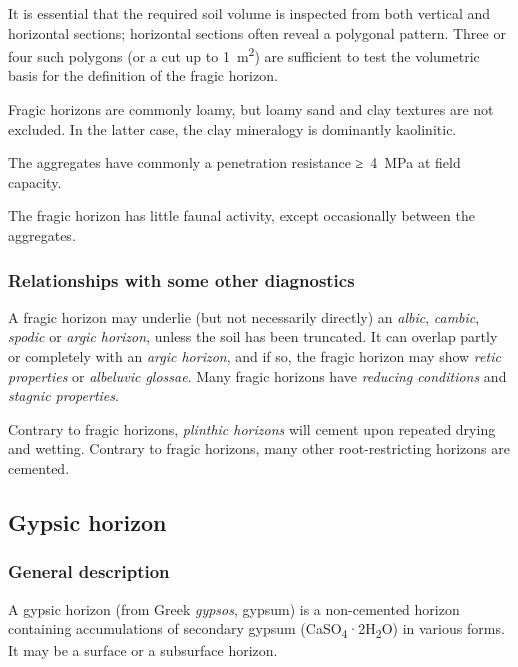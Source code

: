\documentclass[
  letterpaper,
  DIV=11,
  numbers=noendperiod]{scrreprt}
\begin{document}
It is essential that the required soil volume is inspected from both
vertical and horizontal sections; horizontal sections often reveal a
polygonal pattern. Three or four such polygons (or a cut up to
1~m\textsuperscript{2}) are sufficient to test the volumetric basis for
the definition of the fragic horizon.

Fragic horizons are commonly loamy, but loamy sand and clay textures are
not excluded. In the latter case, the clay mineralogy is dominantly
kaolinitic.

The aggregates have commonly a penetration resistance ≥~4~MPa at field
capacity.

The fragic horizon has little faunal activity, except occasionally
between the aggregates.

\hypertarget{relationships-with-some-other-diagnostics-12}{%
\subsubsection{Relationships with some other
diagnostics}\label{relationships-with-some-other-diagnostics-12}}

A fragic horizon may underlie (but not necessarily directly) an
\emph{albic}, \emph{cambic}, \emph{spodic} or \emph{argic horizon},
unless the soil has been truncated. It can overlap partly or completely
with an \emph{argic horizon}, and if so, the fragic horizon may show
\emph{retic properties} or \emph{albeluvic glossae}. Many fragic
horizons have \emph{reducing conditions} and \emph{stagnic properties}.

Contrary to fragic horizons, \emph{plinthic horizons} will cement upon
repeated drying and wetting. Contrary to fragic horizons, many other
root-restricting horizons are cemented.

\hypertarget{gypsic-horizon}{%
\subsection{Gypsic horizon}\label{gypsic-horizon}}

\hypertarget{general-description-13}{%
\subsubsection{General description}\label{general-description-13}}

A gypsic horizon (from Greek \emph{gypsos}, gypsum) is a non-cemented
horizon containing accumulations of secondary gypsum
(CaSO\textsubscript{4}·2H\textsubscript{2}O) in various forms. It may be
a surface or a subsurface horizon.
\end{document}
